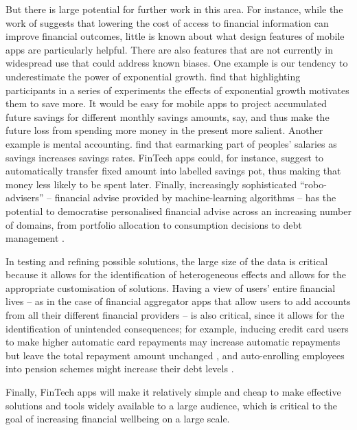 But there is large potential for further work in this area. For
instance, while the work of \citet{levi2020mind} suggests that lowering the
cost of access to financial information can improve financial outcomes, little
is known about what design features of mobile apps are particularly helpful.
There are also features that are not currently in widespread use that could
address known biases. One example is our tendency to underestimate the power of
exponential growth. \citet{mckenzie2011misunderstanding} find that highlighting
participants in a series of experiments the effects of exponential growth
motivates them to save more. It would be easy for mobile apps to project
accumulated future savings for different monthly savings amounts, say, and thus
make the future loss from spending more money in the present more salient.
Another example is mental accounting. \citet{soman2011earmarking} find that
earmarking part of peoples' salaries as savings increases savings rates.
FinTech apps could, for instance, suggest to automatically transfer fixed
amount into labelled savings pot, thus making that money less likely to be
spent later. Finally, increasingly sophisticated ``robo-advisers'' -- financial
advise provided by machine-learning algorithms -- has the potential to
democratise personalised financial advise across an increasing number of
domains, from portfolio allocation to consumption decisions to debt management
\citep{philippon2019fintech, dacunto2021new}.

In testing and refining possible solutions, the large size of the data is
critical because it allows for the identification of heterogeneous effects and
allows for the appropriate customisation of solutions. Having a view of users'
entire financial lives -- as in the case of financial aggregator apps that
allow users to add accounts from all their different financial providers -- is
also critical, since it allows for the identification of unintended
consequences; for example, inducing credit card users to make higher automatic
card repayments may increase automatic repayments but leave the total repayment
amount unchanged \citep{guttman2021semblance}, and auto-enrolling employees
into pension schemes might increase their debt levels
\citep{beshears2022borrowing}.

Finally, FinTech apps will make it relatively simple and cheap to make
effective solutions and tools widely available to a large audience, which is
critical to the goal of increasing financial wellbeing on a large scale.

